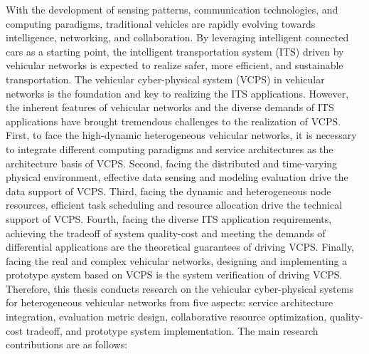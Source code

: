 \begin{eabstract}	%

With the development of sensing patterns, communication technologies, and computing paradigms, traditional vehicles are rapidly evolving towards intelligence, networking, and collaboration. 
By leveraging intelligent connected cars as a starting point, the intelligent transportation system (ITS) driven by vehicular networks is expected to realize safer, more efficient, and sustainable transportation.
The vehicular cyber-physical system (VCPS) in vehicular networks is the foundation and key to realizing the ITS applications. 
However, the inherent features of vehicular networks and the diverse demands of ITS applications have brought tremendous challenges to the realization of VCPS. 
First, to face the high-dynamic heterogeneous vehicular networks, it is necessary to integrate different computing paradigms and service architectures as the architecture basis of VCPS. 
Second, facing the distributed and time-varying physical environment, effective data sensing and modeling evaluation drive the data support of VCPS. 
Third, facing the dynamic and heterogeneous node resources, efficient task scheduling and resource allocation drive the technical support of VCPS. 
Fourth, facing the diverse ITS application requirements, achieving the tradeoff of system quality-cost and meeting the demands of differential applications are the theoretical guarantees of driving VCPS. 
Finally, facing the real and complex vehicular networks, designing and implementing a prototype system based on VCPS is the system verification of driving VCPS. 
Therefore, this thesis conducts research on the vehicular cyber-physical systems for heterogeneous vehicular networks from five aspects: service architecture integration, evaluation metric design, collaborative resource optimization, quality-cost tradeoff, and prototype system implementation. 
The main research contributions are as follows:


\end{eabstract}
